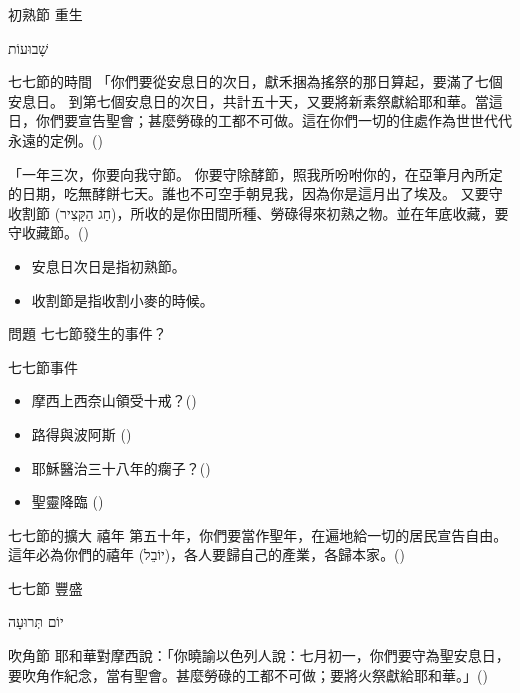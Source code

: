 \documentclass{beamer}
\newcommand{\topic}[1]{
\begin{frame}
    \centering
    \vspace*{1cm}
    {\fontsize{40}{48}\selectfont #1\par}
    \vfill
\end{frame}
}
\newcommand{\question}[1]{
\begin{frame}{問題}
    \centering
    \vspace*{1cm}
    \huge #1？\par
    \vfill
\end{frame}
}
\newcommand{\conclusion}[2]{
\begin{frame}
    \centering
    \vspace*{1cm}
    {\fontsize{40}{48}\selectfont #1 \textemdash #2\par}
    \vfill
\end{frame}
}
\newcommand{\parvspace}{\par\vspace{0.5em}}
\begin{document}
\conclusion{初熟節}{重生}

\topic{\texthebrew{שָׁבוּעוֹת}}

\begin{frame}{七七節的時間}
    「你們要從\alert{安息日的次日}，獻禾捆為搖祭的那日算起，要\alert{滿了七個安息日}。 到\alert{第七個安息日的次日，共計五十天}，又要將新素祭獻給耶和華。\textellipsis{}當這日，你們要宣告聖會；\alert{甚麼勞碌的工都不可做}。這在你們一切的住處作為世世代代永遠的定例。()\parvspace
    「一年三次，你要向我守節。 你要守除酵節，照我所吩咐你的，在亞筆月內所定的日期，吃無酵餅七天。誰也不可空手朝見我，因為你是這月出了埃及。 又要守\alert{收割節 (\texthebrew{חַג הַקָּצִיר})}，所收的是你田間所種、勞碌得來初熟之物。並在年底收藏，要守收藏節。()\parvspace
    \begin{itemize}
        \item 安息日次日是指初熟節。
        \item 收割節是指收割小麥的時候。
    \end{itemize}
\end{frame}

\question{七七節發生的事件}

\begin{frame}{七七節事件}
    \begin{itemize}
        \item 摩西上西奈山領受十戒？()\parencite{TenCommandmentsOnShavuot}
        \item 路得與波阿斯 ()
        \item 耶穌醫治三十八年的瘸子？()
        \item 聖靈降臨 ()
    \end{itemize}
\end{frame}

\begin{frame}{七七節的擴大 \textemdash 禧年}
    第五十年，你們要當作\alert{聖年}，在遍地給一切的居民\alert{宣告自由}。這年必為你們的禧年 (\texthebrew{יוֹבֵל})，各人要\alert{歸自己的產業}，\alert{各歸本家}。()
\end{frame}

\conclusion{七七節}{豐盛}

\topic{\texthebrew{יוֹם תְּרוּעָה}}

\begin{frame}{吹角節}
    耶和華對摩西說：「你曉諭以色列人說：\alert{七月初一}，你們要守為\alert{聖安息日}，要吹角作紀念，當有聖會。甚麼勞碌的工都不可做；要將火祭獻給耶和華。」()\parvspace
\end{frame}
\end{document}
